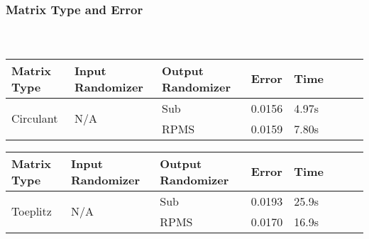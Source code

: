 
\begin{frame}[t]
\frametitle{Matrix Type and Error}
\framesubtitle{~~}  %




\begin{table}[h]
\begin{tabular}{lll|lllll}
	\textbf{Matrix Type}       & \textbf{Input Randomizer} & \textbf{Output Randomizer} & \textbf{Error} & \textbf{Time} & \\ \hline
	\multirow{2}{*}{Circulant} & \multirow{2}{*}{N/A}      & Sub                   & 0.0156         & 4.97s         & \\
	                           &                           & RPMS                  & 0.0159         & 7.80s         & \\
\end{tabular}
\end{table}

\begin{table}[h]
\begin{tabular}{lll|lllll}
	\textbf{Matrix Type}      & \textbf{Input Randomizer} & \textbf{Output Randomizer} & \textbf{Error} & \textbf{Time} & \\ \hline
	\multirow{2}{*}{Toeplitz} & \multirow{2}{*}{N/A}      & Sub                   & 0.0193         & 25.9s         & \\
	                          &                           & RPMS                  & 0.0170         & 16.9s         & \\
\end{tabular}
\end{table}

\end{frame}



